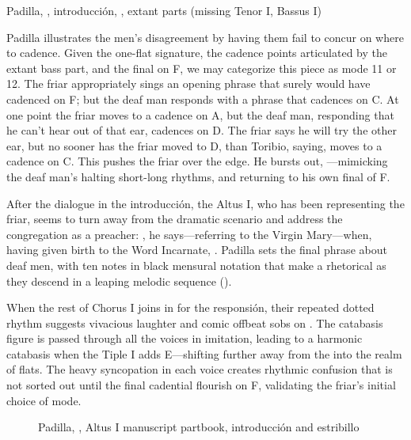 \begin{exmusic}
    \caption{Padilla, , introducción, , extant parts (missing Tenor I, Bassus I)}
    \label{exmusic:Padilla-Sordo-intro}
\end{exmusic}

Padilla illustrates the men's disagreement by having them fail to concur on where to cadence.
Given the one-flat  signature, the cadence points articulated by the extant bass part, and the final on F, we may categorize this piece as mode 11 or 12.
The friar appropriately sings an opening phrase that surely would have cadenced on F; but the deaf man responds with a phrase that cadences on C.
At one point the friar moves to a cadence on A, but the deaf man, responding that he can't hear out of that ear, cadences on D.
The friar says he will try the other ear, but no sooner has the friar moved to D, than Toribio, saying,  moves to a cadence on C.
This pushes the friar over the edge.
He bursts out, ---mimicking the deaf man's halting short-long rhythms, and returning to his own final of F.

After the dialogue in the introducción, the Altus I, who has been representing the friar, seems to turn away from the dramatic scenario and address the congregation as a preacher: , he says---referring to the Virgin Mary---when, having given birth to the Word Incarnate, .
Padilla sets the final phrase about deaf men, with ten notes in black mensural notation that make a rhetorical  as they descend in a leaping melodic sequence ().

When the rest of Chorus I joins in for the responsión, their repeated dotted rhythm suggests vivacious laughter and comic offbeat sobs on .
The catabasis figure is passed through all the voices in imitation, leading to a harmonic catabasis when the Tiple I adds E\fl{}---shifting further away from the  into the  realm of flats.%
\citXXX[chafe?]
The heavy syncopation in each voice creates rhythmic confusion that is not sorted out until the final cadential flourish on F, validating the friar's initial choice of mode.

\begin{figure}
    \caption{Padilla, , Altus I manuscript partbook, introducción and estribillo}
    \label{figure:Padilla-Sordo-MS-estribillo}
\end{figure}


